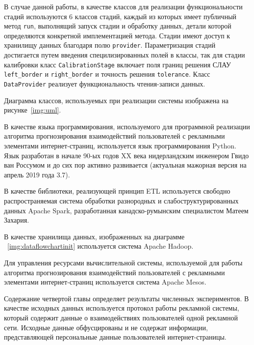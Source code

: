 \documentclass[a4paper, 14pt, oneside]{extarticle}
\begin{document}
    В случае данной работы, в качестве классов для реализации функциональности стадий используются 6 классов стадий, каждый
    из которых имеет публичный метод \texttt{run}, выполнящий запуск стадии и обработку данных, детали которой определяются
    конкретной имплементацией метода. Стадии имеют доступ к хранилищу данных благодаря полю \texttt{provider}. Параметризация
    стадий достигается путем введения специлизированных полей в классы, так для стадии калибровки класс \texttt{CalibrationStage}
    включает поля границ решения СЛАУ \texttt{left\_border} и \texttt{right\_border} и точность решения \texttt{tolerance}. Класс
    \texttt{DataProvider} реализует функциональность чтения-записи данных. 

    Диаграмма классов, используемых при реализации системы изображена
    на рисунке~\eqref{img:uml}.
    

    В качестве языка программирования, используемого для программной реализации алгоритма прогнозирования взаимодействий пользователей
    с рекламными элементами интернет-страниц, используется язык программирования Python. Язык разработан в начале 90-ых годов
    XX века нидерландским инженером Гвидо ван Россумом и до сих пор активно развивается (актуальная мажорная версия на апрель 
    2019 года 3.7).

    В качестве библиотеки, реализующей принцип ETL используется свободно распространяемая
    система обработки разнородных и слабоструктурированных данных Apache Spark, разработанная канадско-румынским специалистом
    Матеем Захария.

    В качестве хранилища данных, изображенных на диаграмме ~\ref{img:dataflowchartinit} используется система
    Apache Hadoop.

    Для управления ресурсами вычислительной системы, используемой для работы алгоритма 
    прогнозирования взаимодействий пользователей с рекламными элементами интернет-страниц
    используется система Apache Mesos.

    Содержание четвертой главы определяет результаты численных экспериментов. В качестве исходных данных используется протокол работы рекламной системы, который содержит данные о взаимодействиях
    пользователей одной рекламной сети. Исходные данные обфусцированы и не содержат информации, представляющей
    персональные данные пользователей интернет-страницы.
\end{document}

